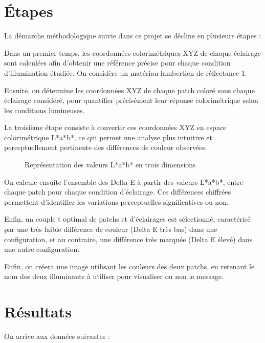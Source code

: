 \documentclass[12pt]{article}
\begin{document}
\clearpage

\section{Étapes}

La démarche méthodologique suivie dans ce projet se décline en plusieurs étapes :

Dans un premier temps, les coordonnées colorimétriques XYZ de chaque éclairage sont calculées afin d'obtenir une référence précise pour chaque condition d'illumination étudiée. On considère un matériau lambertien de réflectance 1.

Ensuite, on détermine les coordonnées XYZ de chaque patch coloré sous chaque éclairage considéré, pour quantifier précisément leur réponse colorimétrique selon les conditions lumineuses.

La troisième étape consiste à convertir ces coordonnées XYZ en espace colorimétrique L*a*b*, ce qui permet une analyse plus intuitive et perceptuellement pertinente des différences de couleur observées.

\begin{figure}[H]
    \centering
    \caption{Représentation des valeurs L*a*b* en trois dimensions}
\end{figure}

On calcule ensuite l'ensemble des Delta E à partir des valeurs L*a*b*, entre chaque patch pour chaque condition d'éclairage. Ces différences chiffrées permettent d'identifier les variations perceptuelles significatives ou non.

Enfin, un couple t optimal de patchs et d'éclairages est sélectionné, caractérisé par une très faible différence de couleur (Delta E très bas) dans une configuration, et au contraire, une différence très marquée (Delta E élevé) dans une autre configuration.

Enfin, on créera une image utilisant les couleurs des deux patchs, en retenant le nom des deux illuminants à utiliser pour visualiser ou non le message.

\clearpage

\section{Résultats}

On arrive aux données suivantes :
\end{document}
